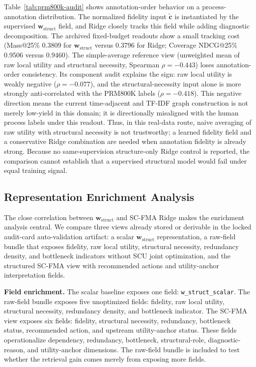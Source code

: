\documentclass[a4paper,fleqn]{cas-sc}
\newcommand{\wstruct}{\ensuremath{\mathbf{w}_{\mathrm{struct}}}}
\begin{document}
Table~\ref{tab:prm800k-audit} shows annotation-order behavior on a process-annotation distribution. The normalized fidelity input $\tilde{\mathbf{c}}$ is instantiated by the supervised \wstruct{} field, and Ridge closely tracks this field while adding diagnostic decomposition. The archived fixed-budget readouts show a small tracking cost (Mass@25\% 0.3809 for \wstruct{} versus 0.3796 for Ridge; Coverage NDCG@25\% 0.9506 versus 0.9460). The simple-average reference view (unweighted mean of raw local utility and structural necessity, Spearman $\rho = -0.443$) loses annotation-order consistency. Its component audit explains the sign: raw local utility is weakly negative ($\rho=-0.077$), and the structural-necessity input alone is more strongly anti-correlated with the PRM800K labels ($\rho=-0.418$). This negative direction means the current time-adjacent and TF-IDF graph construction is not merely low-yield in this domain; it is directionally misaligned with the human process labels under this readout. Thus, in this real-data route, naive averaging of raw utility with structural necessity is not trustworthy; a learned fidelity field and a conservative Ridge combination are needed when annotation fidelity is already strong. Because no same-supervision structure-only Ridge control is reported, the comparison cannot establish that a supervised structural model would fail under equal training signal.

\subsection{Representation Enrichment Analysis}
\label{sec:representation-enrichment}

The close correlation between \wstruct{} and SC-FMA Ridge makes the enrichment analysis central. We compare three views already stored or derivable in the locked audit-card auto-validation artifact: a scalar \wstruct{} representation, a raw-field bundle that exposes fidelity, raw local utility, structural necessity, redundancy density, and bottleneck indicators without SCU joint optimization, and the structured SC-FMA view with recommended actions and utility-anchor interpretation fields.

\textbf{Field enrichment.} The scalar baseline exposes one field: \texttt{w\_struct\_scalar}. The raw-field bundle exposes five unoptimized fields: fidelity, raw local utility, structural necessity, redundancy density, and bottleneck indicator. The SC-FMA view exposes six fields: fidelity, structural necessity, redundancy, bottleneck status, recommended action, and upstream utility-anchor status. These fields operationalize dependency, redundancy, bottleneck, structural-role, diagnostic-reason, and utility-anchor dimensions. The raw-field bundle is included to test whether the retrieval gain comes merely from exposing more fields.
\end{document}
